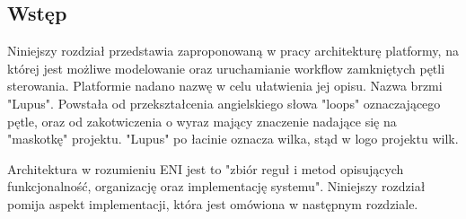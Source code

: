 \subsection{Wstęp}

Niniejszy rozdział przedstawia zaproponowaną w pracy architekturę  platformy, na której jest możliwe modelowanie oraz uruchamianie workflow zamkniętych pętli sterowania. Platformie nadano nazwę w celu ułatwienia jej opisu. Nazwa brzmi "Lupus". Powstała od przekształcenia angielskiego słowa "loops" oznaczającego pętle, oraz od zakotwiczenia o wyraz mający znaczenie nadające się na "maskotkę" projektu. "Lupus" po łacinie oznacza wilka, stąd w logo projektu wilk. 

Architektura w rozumieniu ENI jest to "zbiór reguł i metod opisujących funkcjonalność, organizację oraz implementację systemu". Niniejszy rozdział pomija aspekt implementacji, która jest omówiona w następnym rozdziale.

